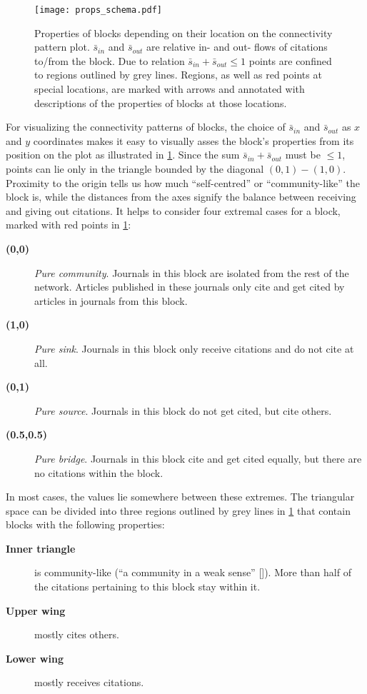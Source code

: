 \documentclass[a4paper,12pt]{article}
\begin{document}
\begin{figure}
  \centering
  \texttt{[image: props\_schema.pdf]}
  \caption{Properties of blocks depending on their location on the connectivity pattern 
plot. $\bar{s}_{in}$ and $\bar{s}_{out}$ are relative in- and out- flows of citations to/from the 
block.
Due to relation $\bar{s}_{in} + \bar{s}_{out} \leq 1$ points are confined to
regions outlined by grey lines.
Regions, as well as red points at special locations, are marked with arrows and
annotated with descriptions of the properties of blocks at those locations. }
  \label{fig:props_schema}
\end{figure}

For visualizing the connectivity patterns of blocks, the choice of $\bar{s}_{in}$ and 
$\bar{s}_{out}$ as $x$ and $y$ coordinates makes it easy to visually asses the block's 
properties from its position on the plot as illustrated in \cref{fig:props_schema}.
Since the sum $\bar{s}_{in}+\bar{s}_{out}$ must be $\leq1$, points can lie only in the
triangle bounded by the diagonal $(0,1)-(1,0)$.
Proximity to the origin 
tells us how much ``self-centred'' or ``community-like'' the block is, while the
distances from the axes signify the balance between receiving and giving out citations.
It helps to consider four extremal cases for a block, marked with red points in \cref{fig:props_schema}:
\begin{description}
  \item[\textbf{(0,0)}] \emph{Pure community}. Journals in this block are isolated from the rest of the network. Articles published in 
these journals only cite and get cited by articles in journals from this block.
  \item[\textbf{(1,0)}] \emph{Pure sink}. Journals in this block only receive citations and do not cite at all.
  \item[\textbf{(0,1)}] \emph{Pure source}. Journals in this block do not get cited, but cite others.
  \item[\textbf{(0.5,0.5)}] \emph{Pure bridge}. Journals in this block cite and get cited equally, but there are no citations within the block.
\end{description}
In most cases, the values lie somewhere between these extremes. 
The triangular space can be divided into three regions outlined by grey lines in
\cref{fig:props_schema} that contain blocks with the following properties:
\begin{description}
  \item[\textbf{Inner triangle}] is community-like (``a community in a weak sense'' [\citealt{Radicchi2004Defining}]). More than half of the citations pertaining to this 
block stay within it.
  \item[\textbf{Upper wing}] mostly cites others.
  \item[\textbf{Lower wing}] mostly receives citations.
\end{description}
\end{document}
